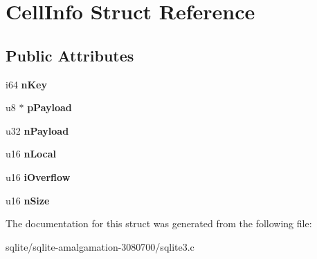 \hypertarget{struct_cell_info}{\section{Cell\+Info Struct Reference}
\label{struct_cell_info}
}
\subsection*{Public Attributes}
\begin{DoxyCompactItemize}
\item 
\hypertarget{struct_cell_info_a542b041b9a54a13f7c6f2fe63e7542c0}{i64 {\bfseries n\+Key}}\label{struct_cell_info_a542b041b9a54a13f7c6f2fe63e7542c0}

\item 
\hypertarget{struct_cell_info_abbcd805bfcc10bed2ff5b81aae466940}{u8 $\ast$ {\bfseries p\+Payload}}\label{struct_cell_info_abbcd805bfcc10bed2ff5b81aae466940}

\item 
\hypertarget{struct_cell_info_ac1e3c1b4216a8e778bbac82907bb1485}{u32 {\bfseries n\+Payload}}\label{struct_cell_info_ac1e3c1b4216a8e778bbac82907bb1485}

\item 
\hypertarget{struct_cell_info_a8cedbcc2c94916fe5798b502c614bb08}{u16 {\bfseries n\+Local}}\label{struct_cell_info_a8cedbcc2c94916fe5798b502c614bb08}

\item 
\hypertarget{struct_cell_info_af7be0161f1c67600aeba783a68972f70}{u16 {\bfseries i\+Overflow}}\label{struct_cell_info_af7be0161f1c67600aeba783a68972f70}

\item 
\hypertarget{struct_cell_info_ace78ab5eb5337b686e31b895feeb0562}{u16 {\bfseries n\+Size}}\label{struct_cell_info_ace78ab5eb5337b686e31b895feeb0562}

\end{DoxyCompactItemize}


The documentation for this struct was generated from the following file\+:\begin{DoxyCompactItemize}
\item 
sqlite/sqlite-\/amalgamation-\/3080700/sqlite3.\+c\end{DoxyCompactItemize}
